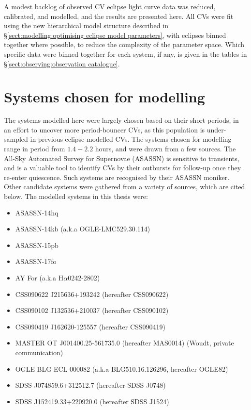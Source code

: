 \label{chpt:results:characterisation of 12 new CVs} %

A modest backlog of observed CV eclipse light curve data was reduced, calibrated, and modelled, and the results are presented here. All CVs were fit using the new hierarchical model structure described in \S\ref{sect:modelling:optimising eclipse model parameters}, with eclipses binned together where possible, to reduce the complexity of the parameter space. Which specific data were binned together for each system, if any, is given in the tables in \S\ref{sect:observing:observation catalogue}.


\section{Systems chosen for modelling}

The systems modelled here were largely chosen based on their short periods, in an effort to uncover more period-bouncer CVs, as this population is under-sampled in previous eclipse-modelled CVs.
The systems chosen for modelling range in period from $1.4 - 2.2$ hours, and were drawn from a few sources.
The All-Sky Automated Survey for Supernovae (ASASSN) \citep{shappee2014} is sensitive to transients, and is a valuable tool to identify CVs by their outbursts for follow-up once they re-enter quiescence. Such systems are recognised by their ASASSN moniker.
Other candidate systems were gathered from a variety of sources, which are cited below.
The modelled systems in this thesis were:
\begin{itemize}
    \setlength\itemsep{0em}
    \item ASASSN-14hq
    \item ASASSN-14kb (a.k.a OGLE-LMC529.30.114)
    \item ASASSN-15pb
    \item ASASSN-17fo
    \item AY For (a.k.a H$\alpha$0242-2802) \citep{woudt2004}
    \item CSS090622 J215636+193242 (hereafter CSS090622) \citep{kato2012,thorstensen2016}
    \item CSS090102 J132536+210037 (hereafter CSS090102) \citep{kato2012}
    \item CSS090419 J162620-125557 (hereafter CSS090419) \citep{kato2012}
    \item MASTER OT J001400.25-561735.0 (hereafter MAS0014) (Woudt, private communication)
    \item OGLE BLG-ECL-000082 (a.k.a BLG510.16.126296, hereafter OGLE82)
    \item SDSS J074859.6+312512.7 (hereafter SDSS J0748) \citep{kato2016}
    \item SDSS J152419.33+220920.0 (hereafter SDSS J1524) \citep{southworth2010,michel2013}
\end{itemize}

